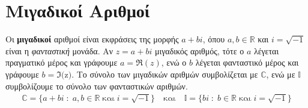 




\DeclareMathOperator{\Arg}{Arg}
\setcounter{chapter}{1}

\pagestyle{vangelis}
\everymath{\displaystyle}

\newcommand{\twocolumnsiderr}[2]{\begin{minipage}[t]{0.38\linewidth}\raggedright
    #1
    \end{minipage}\hfill\begin{minipage}[t]{0.52\linewidth}\raggedright
    #2
  \end{minipage}
}

\newcommand{\threecolumnsidess}[3]{\begin{minipage}[c]{0.30\linewidth}\raggedright
    #1
    \end{minipage}\hfill\begin{minipage}[c]{0.35\linewidth}\raggedright
    #2
    \end{minipage}\hfill\begin{minipage}[c]{0.30\linewidth}\raggedright
    #3
  \end{minipage}
}

\newcommand{\fourcolumnsides}[4]{\begin{minipage}[c]{0.22\linewidth}\raggedright
    #1
    \end{minipage}\hfill\begin{minipage}[c]{0.28\linewidth}\raggedright
    #2
    \end{minipage}\hfill\begin{minipage}[c]{0.28\linewidth}\raggedright
    #3
    \end{minipage}\hfill\begin{minipage}[c]{0.22\linewidth}\raggedright
    #4
  \end{minipage}
}


\chapter*{Μιγαδικοί Αριθμοί}


Οι \textbf{μιγαδικοί} αριθμοί είναι εκφράσεις της μορφής $ a+bi $, 
όπου $ a,b \in \mathbb{R} $ και $ i= \sqrt{-1} $ είναι η \textit{φανταστική} μονάδα. 
Αν $ z=a+bi $ μιγαδικός αριθμός, τότε ο $a$ λέγεται 
\textcolor{Col1}{πραγματικό μέρος} και γράφουμε $ a = \Re(z) $, 
ενώ ο $b$ λέγεται \textcolor{Col1}{φανταστικό μέρος} και γράφουμε $b=\Im($z$)$. 
Το σύνολο των μιγαδικών αριθμών συμβολίζεται με $ \mathbb{C} $, ενώ με $ \mathbb{I} $ 
συμβολίζουμε το σύνολο των φανταστικών αριθμών.
\begin{align*}
  \mathbb{C} = \{ a+bi \; : \; a,b \in \mathbb{R} \; \text{και} \; i = \sqrt{-1}
    \} \quad \text{και} \quad \mathbb{I} = \{ bi \; : \; b \in \mathbb{R} 
  \; \text{και} \; i = \sqrt{-1} \}  
\end{align*}

